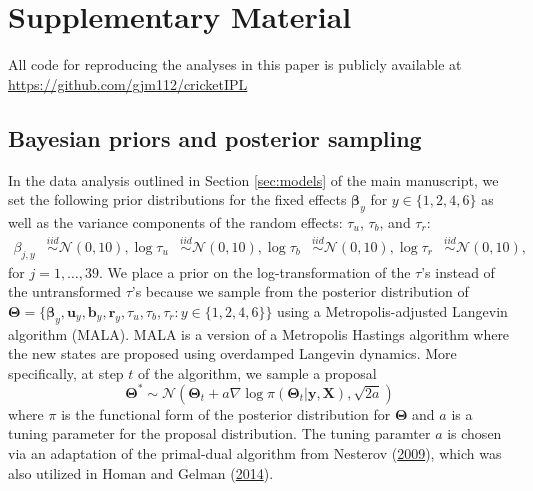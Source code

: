 \documentclass[
  12pt,
]{article}
\begin{document}
\hypertarget{supplementary-material}{%
\section*{Supplementary Material}\label{supplementary-material}}

All code for reproducing the analyses in this paper is publicly
available at \url{https://github.com/gjm112/cricketIPL}

\hypertarget{bayesian-priors-and-posterior-sampling}{%
\subsection{Bayesian priors and posterior
sampling}\label{bayesian-priors-and-posterior-sampling}}

In the data analysis outlined in Section \ref{sec:models} of the main
manuscript, we set the following prior distributions for the fixed
effects \(\boldsymbol{\beta}_y\) for \(y \in \{1,2,4,6\}\) as well as
the variance components of the random effects: \(\tau_u\), \(\tau_b\),
and \(\tau_r\): \begin{align}
\beta_{j,y} & \overset{iid}{\sim}\mathcal{N}(0,10),
\log \tau_u & \overset{iid}{\sim}\mathcal{N}(0,10),
\log \tau_b & \overset{iid}{\sim}\mathcal{N}(0,10),
\log \tau_r & \overset{iid}{\sim}\mathcal{N}(0,10),
\end{align} for \(j = 1,\dots,39\). We place a prior on the
log-transformation of the \(\tau\)'s instead of the untransformed
\(\tau\)'s because we sample from the posterior distribution of
\(\boldsymbol{\Theta} = \{\boldsymbol{\beta}_y, \boldsymbol{u}_y,\boldsymbol{b}_y,\boldsymbol{r}_y,\tau_u,\tau_b,\tau_r: y \in \{1,2,4,6\}\}\)
using a Metropolis-adjusted Langevin algorithm (MALA). MALA is a version
of a Metropolis Hastings algorithm where the new states are proposed
using overdamped Langevin dynamics. More specifically, at step \(t\) of
the algorithm, we sample a proposal
\[\boldsymbol{\Theta}^* \sim \mathcal{N}\left(\boldsymbol{\Theta}_t + a\nabla \log \pi(\boldsymbol{\Theta}_t|\boldsymbol{y},\boldsymbol{X}), \sqrt{2a}\right)\]
where \(\pi\) is the functional form of the posterior distribution for
\(\boldsymbol{\Theta}\) and \(a\) is a tuning parameter for the proposal
distribution. The tuning paramter \(a\) is chosen via an adaptation of
the primal-dual algorithm from Nesterov
(\protect\hyperlink{ref-Nesterov2009}{2009}), which was also utilized in
Homan and Gelman (\protect\hyperlink{ref-NUTS}{2014}).
\end{document}
